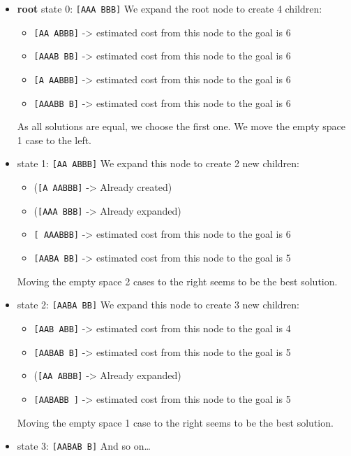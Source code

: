 \documentclass{article}
\begin{document}
\begin{itemize}
  \item \textbf{root} state 0: \texttt{[AAA BBB]}
  We expand the root node to create 4 children:
  \begin{itemize}
    \item \texttt{[AA ABBB]} -> estimated cost from this node to the goal is 6
    \item \texttt{[AAAB BB]} -> estimated cost from this node to the goal is 6
    \item \texttt{[A AABBB]} -> estimated cost from this node to the goal is 6
    \item \texttt{[AAABB B]} -> estimated cost from this node to the goal is 6
  \end{itemize}
  As all solutions are equal, we choose the first one.
  We move the empty space 1 case to the left.

  \item state  1: \texttt{[AA ABBB]}
  We expand this node to create 2 new children:
  \begin{itemize}
    \item (\texttt{[A AABBB]} -> Already created)
    \item (\texttt{[AAA BBB]} -> Already expanded)
    \item \texttt{[ AAABBB]} -> estimated cost from this node to the goal is 6
    \item \texttt{[AABA BB]} -> estimated cost from this node to the goal is 5
  \end{itemize}
  Moving the empty space 2 cases to the right seems to be the best solution. 

  \item state  2: \texttt{[AABA BB]}
  We expand this node to create 3 new children:
  \begin{itemize}
    \item \texttt{[AAB ABB]} -> estimated cost from this node to the goal is 4
    \item \texttt{[AABAB B]} -> estimated cost from this node to the goal is 5
    \item (\texttt{[AA ABBB]} -> Already expanded)
    \item \texttt{[AABABB ]} -> estimated cost from this node to the goal is 5
    \end{itemize}
  Moving the empty space 1 case to the right seems to be the best solution. 
  
  \item state  3: \texttt{[AABAB B]}
  And so on\ldots


\end{itemize}
\end{document}
